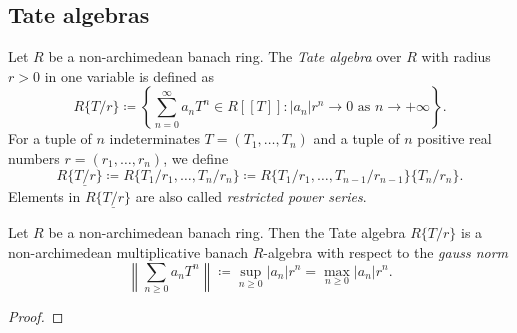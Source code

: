 \subsection{Tate algebras}

    \begin{definition}\label{def:Tate_algebra_over_banach_ring}
        Let \(R\) be a non-archimedean banach ring.
        The \emph{Tate algebra} over \(R\) with radius \(r > 0\) in one variable is defined as
        \[ R\{T/r\} \coloneqq \left\{ \sum_{n=0}^{\infty} a_n T^n \in R[[T]] : |a_n| r^n \to 0 \text{ as } n \to +\infty \right\}. \]
        For a tuple of \(n\) indeterminates \(T = (T_1, \ldots, T_n)\) and a tuple of \(n\) positive real numbers \(r = (r_1, \ldots, r_n)\), we define
        \[ R\{\underline{T/r}\} \coloneq R\{T_1/r_1, \ldots, T_n/r_n\} \coloneq R\{T_1/r_1, \ldots, T_{n-1}/r_{n-1}\}\{T_n/r_n\}. \]
        Elements in \(R\{\underline{T/r}\}\) are also called \emph{restricted power series}.
    \end{definition}

    \begin{proposition}\label{prop:Tate_algebra_is_a_banach_algebra_over_R}
        Let \(R\) be a non-archimedean banach ring.
        Then the Tate algebra \(R\{ T/r \} \) is a non-archimedean multiplicative banach \(R\)-algebra with respect to the \emph{gauss norm}
        \[
            \left\| \sum_{n \geq 0} a_n T^n \right\| \coloneq \sup_{n\geq 0} |a_n|r^n = \max_{n \geq 0} |a_n|r^n.
        \]
    \end{proposition}
    \begin{proof}
    \end{proof}




